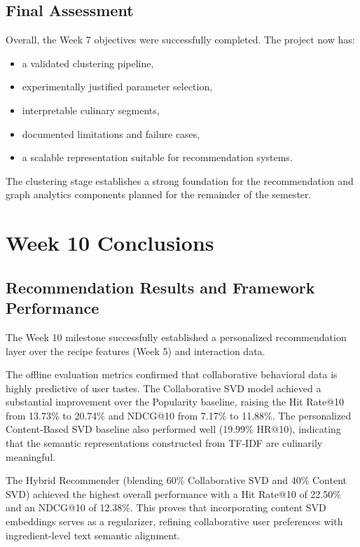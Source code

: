 \documentclass[11pt,a4paper]{article}
\begin{document}
\subsection{Final Assessment}

Overall, the Week 7 objectives were successfully completed. The project now has:
\begin{itemize}
    \item a validated clustering pipeline,
    \item experimentally justified parameter selection,
    \item interpretable culinary segments,
    \item documented limitations and failure cases,
    \item a scalable representation suitable for recommendation systems.
\end{itemize}

The clustering stage establishes a strong foundation for the recommendation and graph analytics components planned for the remainder of the semester.

\section{Week 10 Conclusions}

\subsection{Recommendation Results and Framework Performance}
The Week 10 milestone successfully established a personalized recommendation layer over the recipe features (Week 5) and interaction data. 

The offline evaluation metrics confirmed that collaborative behavioral data is highly predictive of user tastes. The Collaborative SVD model achieved a substantial improvement over the Popularity baseline, raising the Hit Rate@10 from 13.73\% to 20.74\% and NDCG@10 from 7.17\% to 11.88\%. The personalized Content-Based SVD baseline also performed well (19.99\% HR@10), indicating that the semantic representations constructed from TF-IDF are culinarily meaningful.

The Hybrid Recommender (blending 60\% Collaborative SVD and 40\% Content SVD) achieved the highest overall performance with a Hit Rate@10 of 22.50\% and an NDCG@10 of 12.38\%. This proves that incorporating content SVD embeddings serves as a regularizer, refining collaborative user preferences with ingredient-level text semantic alignment.
\end{document}
